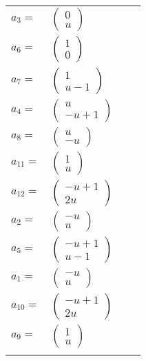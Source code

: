 \documentclass[1p]{elsarticle_modified}
\theoremstyle{definition}
\begin{document}
\begin{tabular}{m{7pt} m{180pt} m{7pt} m{180pt} }
\flushright $a_{3}=$&$\begin{pmatrix}0\\u\end{pmatrix}$ \\
\flushright $a_{6}=$&$\begin{pmatrix}1\\0\end{pmatrix}$ \\
\flushright $a_{7}=$&$\begin{pmatrix}1\\u-1\end{pmatrix}$ \\
\flushright $a_{4}=$&$\begin{pmatrix}u\\- u+1\end{pmatrix}$ \\
\flushright $a_{8}=$&$\begin{pmatrix}u\\- u\end{pmatrix}$ \\
\flushright $a_{11}=$&$\begin{pmatrix}1\\u\end{pmatrix}$ \\
\flushright $a_{12}=$&$\begin{pmatrix}- u+1\\2 u\end{pmatrix}$ \\
\flushright $a_{2}=$&$\begin{pmatrix}- u\\u\end{pmatrix}$ \\
\flushright $a_{5}=$&$\begin{pmatrix}- u+1\\u-1\end{pmatrix}$ \\
\flushright $a_{1}=$&$\begin{pmatrix}- u\\u\end{pmatrix}$ \\
\flushright $a_{10}=$&$\begin{pmatrix}- u+1\\2 u\end{pmatrix}$ \\
\flushright $a_{9}=$&$\begin{pmatrix}1\\u\end{pmatrix}$\\&\end{tabular}
\end{document}
